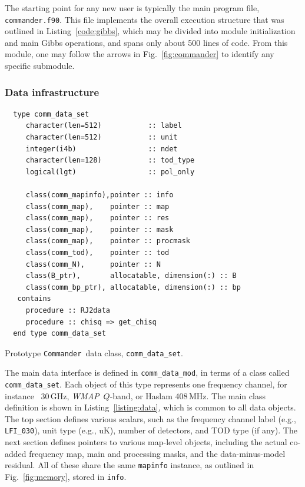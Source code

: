 \documentclass[twocolumn]{aa}
\def\WMAP{\emph{WMAP}}
\def\commander{\texttt{Commander}}
\begin{document}
The starting point for any new user is typically the main program
file, \texttt{commander.f90}. This file implements the overall
execution structure that was outlined in Listing~\ref{code:gibbs}, which
may be divided into module initialization and main Gibbs operations,
and spans only about 500 lines of code. From this module, one may
follow the arrows in Fig.~\ref{fig:commander} to identify any specific
submodule.

\subsubsection{Data infrastructure}

\begin{lstfloat}[t]
  {\scriptsize
    \begin{tcolorbox}
\begin{lstlisting}
  type comm_data_set
     character(len=512)           :: label
     character(len=512)           :: unit
     integer(i4b)                 :: ndet
     character(len=128)           :: tod_type
     logical(lgt)                 :: pol_only

     class(comm_mapinfo),pointer :: info
     class(comm_map),    pointer :: map 
     class(comm_map),    pointer :: res 
     class(comm_map),    pointer :: mask
     class(comm_map),    pointer :: procmask
     class(comm_tod),    pointer :: tod
     class(comm_N),      pointer :: N  
     class(B_ptr),       allocatable, dimension(:) :: B
     class(comm_bp_ptr), allocatable, dimension(:) :: bp
   contains
     procedure :: RJ2data
     procedure :: chisq => get_chisq
  end type comm_data_set
\end{lstlisting}
    \end{tcolorbox}
}
\caption{Prototype \commander\ data class, \texttt{comm\_data\_set}.}\label{listing:data}
\end{lstfloat}

The main data interface is defined in \texttt{comm\_data\_mod}, in
terms of a class called \texttt{comm\_data\_set}. Each object of this
type represents one frequency channel, for instance \Planck\ 30\,GHz,
\WMAP\ $Q$-band, or Haslam 408\,MHz. The main class definition is
shown in Listing~\ref{listing:data}, which is common to all data
objects. The top section defines various scalars, such as the
frequency channel label (e.g., \texttt{LFI\_030}), unit type (e.g.,
uK), number of detectors, and TOD type (if any). The next section
defines pointers to various map-level objects, including the actual
co-added frequency map, main and processing masks, and the
data-minus-model residual. All of these share the same
\texttt{mapinfo} instance, as outlined in Fig.~\ref{fig:memory},
stored in \texttt{info}.
\end{document}

